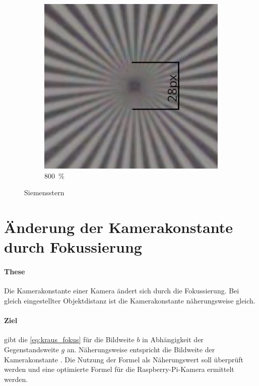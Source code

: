 \documentclass[./00PhotoBox.tex]{subfiles}
\begin{document}
\begin{figure}[htbp]
\begin{subfigure}{0.45\textwidth}
        \includegraphics[height=0.9\linewidth]{./img/4_voruntersuchung/siemens_beschriftet.jpg}
        \centering
        \caption{\SI{800}{\percent}}
        \label{img:siemens_beschriftet}
    \end{subfigure}
    \caption{Siemensstern}
\end{figure}


\section{Änderung der Kamerakonstante durch Fokussierung}
\label{sec:fokus}

\paragraph{These}
Die \Gls{Kamerakonstante} einer Kamera ändert sich durch die Fokussierung. Bei gleich eingestellter Objektdistanz ist die \Gls{Kamerakonstante} näherungsweise gleich.

\paragraph{Ziel}
\citet[S. 59]{kraus} gibt die \autoref{eq:kraus_fokus} für die \Gls{Bildweite} $b$ in Abhängigkeit der Gegenstandsweite $g$ an. Näherungsweise entspricht die \Gls{Bildweite} der \Gls{Kamerakonstante} \citep[vgl.][S. 59]{kraus}. Die Nutzung der Formel als Näherungswert soll überprüft werden und eine optimierte Formel für die Raspberry-Pi-Kamera ermittelt werden.
\end{document}
